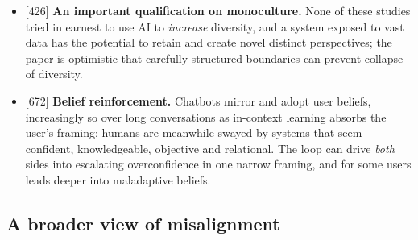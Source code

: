 \documentclass[11pt]{article}
\newcommand{\ct}[1]{{\footnotesize\color{black!55}[#1]}\hspace{1pt}}
\begin{document}
\begin{itemize}
  \item \ct{426} \textbf{An important qualification on monoculture.} None of these studies tried in earnest to use AI to \emph{increase} diversity, and a system exposed to vast data has the potential to retain and create novel distinct perspectives; the paper is optimistic that carefully structured boundaries can prevent collapse of diversity.
  \item \ct{672} \textbf{Belief reinforcement.} Chatbots mirror and adopt user beliefs, increasingly so over long conversations as in-context learning absorbs the user's framing; humans are meanwhile swayed by systems that seem confident, knowledgeable, objective and relational. The loop can drive \emph{both} sides into escalating overconfidence in one narrow framing, and for some users leads deeper into maladaptive beliefs.
\end{itemize}

\subsection{A broader view of misalignment}
\end{document}

